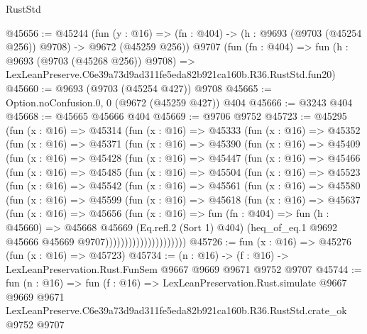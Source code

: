 \begin{lexlean}{RustStd}
\begin{coremodule}
@45656 := @45244
    (fun (y : @16) => (fn : @404) -> (h : @9693 (@9703 (@45254 @256)) @9708) -> @9672 (@45259 @256))
    @9707
    (fun (fn : @404) =>
    fun (h : @9693 (@9703 (@45268 @256)) @9708) =>
    LexLeanPreserve.C6e39a73d9ad311fe5eda82b921ca160b.R36.RustStd.fun20)
@45660 := @9693 (@9703 (@45254 @427)) @9708
@45665 := Option.noConfusion.{0, 0} (@9672 (@45259 @427)) @404
@45666 := @3243 @404
@45668 := @45665 @45666 @404
@45669 := @9706 @9752
@45723 := @45295
    (fun (x : @16) =>
    @45314
      (fun (x : @16) =>
      @45333
        (fun (x : @16) =>
        @45352
          (fun (x : @16) =>
          @45371
            (fun (x : @16) =>
            @45390
              (fun (x : @16) =>
              @45409
                (fun (x : @16) =>
                @45428
                  (fun (x : @16) =>
                  @45447
                    (fun (x : @16) =>
                    @45466
                      (fun (x : @16) =>
                      @45485
                        (fun (x : @16) =>
                        @45504
                          (fun (x : @16) =>
                          @45523
                            (fun (x : @16) =>
                            @45542
                              (fun (x : @16) =>
                              @45561
                                (fun (x : @16) =>
                                @45580
                                  (fun (x : @16) =>
                                  @45599
                                    (fun (x : @16) =>
                                    @45618
                                      (fun (x : @16) =>
                                      @45637
                                        (fun (x : @16) =>
                                        @45656
                                          (fun (x : @16) =>
                                          fun (fn : @404) =>
                                          fun (h : @45660) =>
                                          @45668
                                            @45669
                                            (Eq.refl.{2} (Sort 1) @404)
                                            (heq_of_eq.{1}
                                              @9692
                                              @45666
                                              @45669
                                              @9707)))))))))))))))))))))
@45726 := fun (x : @16) => @45276 (fun (x : @16) => @45723)
@45734 := (n : @16) -> (f : @16) -> LexLeanPreservation.Rust.FunSem @9667 @9669 @9671 @9752 @9707
@45744 := fun (n : @16) =>
  fun (f : @16) =>
  LexLeanPreservation.Rust.simulate
    @9667
    @9669
    @9671
    LexLeanPreserve.C6e39a73d9ad311fe5eda82b921ca160b.R36.RustStd.crate_ok
    @9752
    @9707
\end{coremodule}
\end{lexlean}
